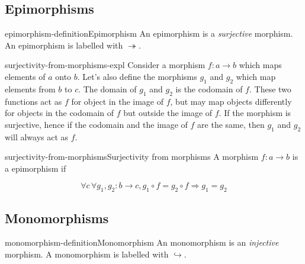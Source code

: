 \documentclass[preview]{standalone}
\begin{document}
\subsection{Epimorphisms}

\begin{snippetdefinition}{epimorphism-definition}{Epimorphism}
    An epimorphism is a \textit{surjective} morphism.
    An epimorphism is labelled with \(\twoheadrightarrow\).
\end{snippetdefinition}

\begin{snippet}{surjectivity-from-morphisms-expl}
    Consider a morphism \(f: a \rightarrow b\) which maps elements of \(a\) onto \(b\).
    Let's also define the morphisms \(g_1\) and \(g_2\) which map elements from \(b\) to \(c\).
    The domain of \(g_1\) and \(g_2\) is the codomain of \(f\). These two functions act
    as \(f\) for object in the image of \(f\), but may map objects differently
    for objects in the codomain of \(f\) but outside the image of \(f\).
    If the morphism is surjective, hence if the codomain and the image of \(f\) are the same,
    then \(g_1\) and \(g_2\) will always act as \(f\).
\end{snippet}

\begin{snippetdefinition}{surjectivity-from-morphisms}{Surjectivity from morphisms}
    A morphism \(f: a \rightarrow b\) is a epimorphism if

    \[
        \forall c\, \forall g_1, g_2 : b \rightarrow c, g_1 \circ f = g_2 \circ f \Rightarrow g_1 = g_2
    \]

    \begin{center}
    \end{center}
\end{snippetdefinition}

\subsection{Monomorphisms}

\begin{snippetdefinition}{monomorphism-definition}{Monomorphism}
    An monomorphism is an \textit{injective} morphism.
    A monomorphism is labelled with \(\hookrightarrow\).
\end{snippetdefinition}
\end{document}
